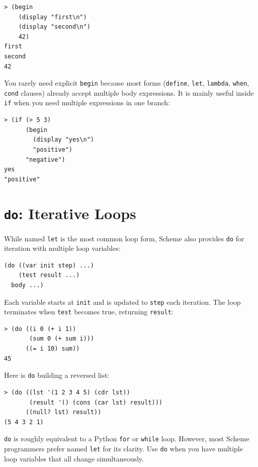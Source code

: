 \begin{lstlisting}[style=repl]
> (begin
    (display "first\n")
    (display "second\n")
    42)
first
second
42
\end{lstlisting}

You rarely need explicit \texttt{begin} because most forms (\texttt{define}, \texttt{let}, \texttt{lambda}, \texttt{when}, \texttt{cond} clauses) already accept multiple body expressions. It is mainly useful inside \texttt{if} when you need multiple expressions in one branch:

\begin{lstlisting}[style=repl]
> (if (> 5 3)
      (begin
        (display "yes\n")
        "positive")
      "negative")
yes
"positive"
\end{lstlisting}

\section{\texttt{do}: Iterative Loops}

While named \texttt{let} is the most common loop form, Scheme also provides \texttt{do} for iteration with multiple loop variables:

\begin{lstlisting}
(do ((var init step) ...)
    (test result ...)
  body ...)
\end{lstlisting}

Each variable starts at \texttt{init} and is updated to \texttt{step} each iteration. The loop terminates when \texttt{test} becomes true, returning \texttt{result}:

\begin{lstlisting}[style=repl]
> (do ((i 0 (+ i 1))
       (sum 0 (+ sum i)))
      ((= i 10) sum))
45
\end{lstlisting}

Here is \texttt{do} building a reversed list:

\begin{lstlisting}[style=repl]
> (do ((lst '(1 2 3 4 5) (cdr lst))
       (result '() (cons (car lst) result)))
      ((null? lst) result))
(5 4 3 2 1)
\end{lstlisting}

\begin{note}
\texttt{do} is roughly equivalent to a Python \texttt{for} or \texttt{while} loop. However, most Scheme programmers prefer named \texttt{let} for its clarity. Use \texttt{do} when you have multiple loop variables that all change simultaneously.
\end{note}

